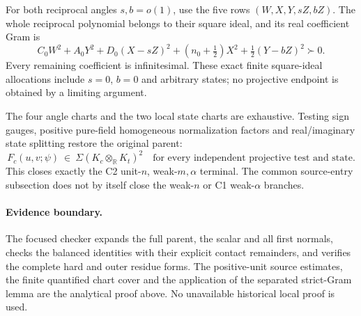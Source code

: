 For both reciprocal angles \(s,b=o(1)\), use the five rows
\((W,X,Y,sZ,bZ)\). The whole reciprocal polynomial belongs
to their square ideal, and its real coefficient Gram is
\[
 C_0W^2+A_0Y^2+D_0(X-sZ)^2
          +(n_0+\tfrac12)X^2+\tfrac12(Y-bZ)^2\succ0 .
 \tag{WA26}
\]
Every remaining coefficient is infinitesimal. These exact finite
square-ideal allocations include \(s=0\), \(b=0\) and arbitrary
states; no projective endpoint is obtained by a limiting argument.

The four angle charts and the two local state charts are exhaustive.
Testing sign gauges, positive pure-field homogeneous normalization
factors and real/imaginary state splitting restore the original parent:
\[
 F_c(u,v;\psi)\ \in\ \Sigma(K_c\otimes_{\mathbb R}K_t)^2
 \quad\text{for every independent projective test and state.}
 \tag{WA27}
\]
This closes exactly the C2 unit-\(n\), weak-\(m,\alpha\) terminal.
The common source-entry subsection does not by itself close the
weak-\(n\) or C1 weak-\(\alpha\) branches.

\paragraph{Evidence boundary.}
The focused checker expands the full parent, the scalar and all first
normals, checks the balanced identities with their explicit contact
remainders, and verifies the complete hard and outer residue forms.
The positive-unit source estimates, the finite quantified chart cover
and the application of the separated strict-Gram lemma are the
analytical proof above. No unavailable historical local proof is used.
